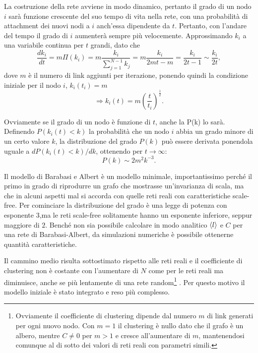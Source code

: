 La costruzione della rete avviene in modo dinamico, pertanto il grado di un nodo $i$ sarà funzione crescente del suo tempo di vita nella rete, con una probabilità di attachment dei nuovi nodi a $i$ anch'essa dipendente da $t$. Pertanto, con l'andare del tempo il grado di $i$ aumenterà sempre più velocemente. Approssimando $k_i$ a una variabile continua per $t$ grandi, dato che 
\[\frac{dk_i}{dt} = m \Pi (k_i) = m \frac{k_i}{\sum_{j=1}^{N-1} k_j} = m \frac{k_i}{2mt - m} = \frac{k_i}{2t - 1} \sim \frac{k_i}{2t},\]
dove $m$ è il numero di link aggiunti per iterazione, ponendo quindi la condizione iniziale per il nodo $i$, $k_i(t_i) = m$
\[ \Rightarrow k_i(t) = m (\frac{t}{t_i})^\frac{1}{2}. \]

Ovviamente se il grado di un nodo è funzione di $t$, anche la P(k) lo sarà. Definendo $P(k_i(t)<k)$ la probabilità che un nodo $i$ abbia un grado minore di un certo valore $k$, la distribuzione del grado $P(k)$ può essere derivata ponendola uguale a $dP(k_i(t)<k)/dk$, ottenendo per $t\rightarrow \infty$:
\[ P(k)\sim 2m^2 k^{-3}. \]


Il modello di Barabasi e Albert è un modello minimale, importantissimo perché il primo in grado di riprodurre un grafo che mostrasse un'invarianza di scala, ma che in alcuni aspetti mal si accorda con quelle reti reali con caratteristiche scale-free. Per cominciare la distribuzione del grado è una legge di potenza con esponente $3$,ma le reti scale-free solitamente hanno un esponente inferiore, seppur maggiore di $2$. Benché non sia possibile calcolare in modo analitico $\braket{l}$ e $C$ per una rete di Barabasi-Albert, da simulazioni numeriche è possibile ottenerne quantità caratteristiche. 

Il cammino medio risulta sottostimato rispetto alle reti reali e il coefficiente di clustering non è costante con l'aumentare di $N$ come per le reti reali ma diminuisce, anche se più lentamente di una rete random\footnote{Ovviamente il coefficiente di clustering dipende dal numero $m$ di link generati per ogni nuovo nodo. Con $m = 1$ il clustering \`e nullo dato che il grafo \`e un albero, mentre $C \neq 0$ per $m>1$ e cresce all'aumentare di $m$, mantenendosi comunque al di sotto dei valori di reti reali con parametri simili.} \parencite{Barbalbert2002}. Per questo motivo il modello iniziale è stato integrato e reso più complesso.  

